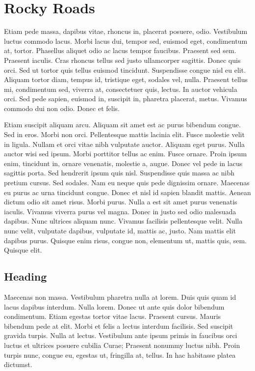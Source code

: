 \section{Rocky Roads}
Etiam pede massa, dapibus vitae, rhoncus in, placerat posuere, odio. Vestibulum luctus
commodo lacus. Morbi lacus dui, tempor sed, euismod eget, condimentum at, tortor.
Phasellus aliquet odio ac lacus tempor faucibus. Praesent sed sem. Praesent iaculis. Cras
rhoncus tellus sed justo ullamcorper sagittis. Donec quis orci. Sed ut tortor quis tellus
euismod tincidunt. Suspendisse congue nisl eu elit. Aliquam tortor diam, tempus id, tristique
eget, sodales vel, nulla. Praesent tellus mi, condimentum sed, viverra at, consectetuer quis,
lectus. In auctor vehicula orci. Sed pede sapien, euismod in, suscipit in, pharetra placerat,
metus. Vivamus commodo dui non odio. Donec et felis.

Etiam suscipit aliquam arcu. Aliquam sit amet est ac purus bibendum congue. Sed in eros.
Morbi non orci. Pellentesque mattis lacinia elit. Fusce molestie velit in ligula. Nullam et
orci vitae nibh vulputate auctor. Aliquam eget purus. Nulla auctor wisi sed ipsum. Morbi
porttitor tellus ac enim. Fusce ornare. Proin ipsum enim, tincidunt in, ornare venenatis,
molestie a, augue. Donec vel pede in lacus sagittis porta. Sed hendrerit ipsum quis nisl.
Suspendisse quis massa ac nibh pretium cursus. Sed sodales. Nam eu neque quis pede
dignissim ornare. Maecenas eu purus ac urna tincidunt congue.
Donec et nisl id sapien blandit mattis. Aenean dictum odio sit amet risus. Morbi purus.
Nulla a est sit amet purus venenatis iaculis. Vivamus viverra purus vel magna. Donec in
justo sed odio malesuada dapibus. Nunc ultrices aliquam nunc. Vivamus facilisis pellentesque
velit. Nulla nunc velit, vulputate dapibus, vulputate id, mattis ac, justo. Nam mattis elit
dapibus purus. Quisque enim risus, congue non, elementum ut, mattis quis, sem. Quisque
elit.

\subsection{Heading}
Maecenas non massa. Vestibulum pharetra nulla at lorem. Duis quis quam id lacus dapibus
interdum. Nulla lorem. Donec ut ante quis dolor bibendum condimentum. Etiam egestas
tortor vitae lacus. Praesent cursus. Mauris bibendum pede at elit. Morbi et felis a lectus
interdum facilisis. Sed suscipit gravida turpis. Nulla at lectus. Vestibulum ante ipsum
primis in faucibus orci luctus et ultrices posuere cubilia Curae; Praesent nonummy luctus
nibh. Proin turpis nunc, congue eu, egestas ut, fringilla at, tellus. In hac habitasse platea
dictumst.

